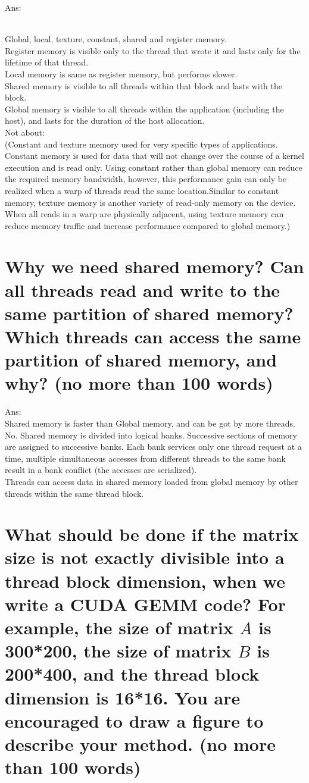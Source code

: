 \documentclass{article}
\begin{document}
Ans:%

~\\Global, local, texture, constant, shared and register memory. 
\\Register memory is visible only to the thread that wrote it and lasts only for the lifetime of that thread.
\\Local memory is same as register memory, but performs slower.
\\Shared memory is visible to all threads within that block and lasts with the block. 
\\Global memory is visible to all threads within the application (including the host), and lasts for the duration of the host allocation.
\\Not about:
\\(Constant and texture memory used for very specific types of applications. Constant memory is used for data that will not change over the course of a kernel execution and is read only. Using constant rather than global memory can reduce the required memory bandwidth, however, this performance gain can only be realized when a warp of threads read the same location.Similar to constant memory, texture memory is another variety of read-only memory on the device. When all reads in a warp are physically adjacent, using texture memory can reduce memory traffic and increase performance compared to global memory.)


\section{Why we need shared memory? Can all threads read and write to the same partition of shared memory? Which threads can access the same partition of shared memory, and why? (no more than 100 words)}

Ans:%
~\\Shared memory is faster than Global memory, and can be got by more threads.
\\No. Shared memory is divided into logical banks. Successive sections of memory are assigned to successive banks. Each bank services only one thread request at a time, multiple simultaneous accesses from different threads to the same bank result in a bank conflict (the accesses are serialized).
\\Threads can access data in shared memory loaded from global memory by other threads within the same thread block.

\section{What should be done if the matrix size is not exactly divisible into a thread block dimension, when we write a CUDA GEMM code? For example, the size of matrix $A$ is 300*200, the size of matrix $B$ is 200*400, and the thread block dimension is 16*16. You are encouraged to draw a figure to describe your method. (no more than 100 words)}
\end{document}
